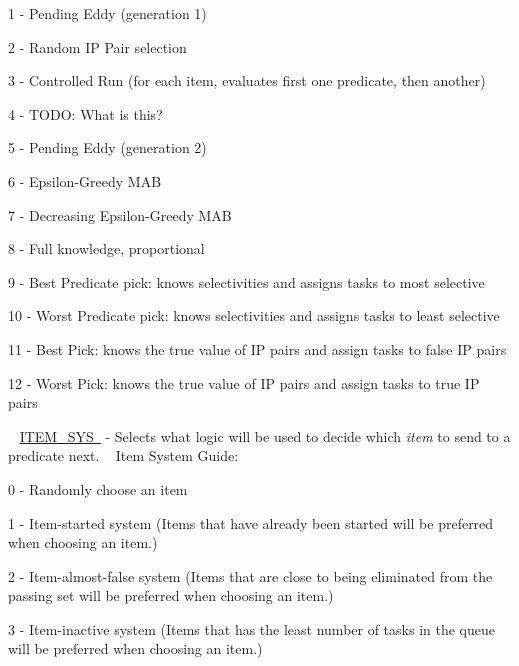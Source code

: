 \begin{DoxyItemize}
\item 1 -\/ Pending Eddy (generation 1)
\item 2 -\/ Random IP Pair selection
\item 3 -\/ Controlled Run (for each item, evaluates first one predicate, then another)
\item 4 -\/ T\+O\+DO\+: What is this?
\item 5 -\/ Pending Eddy (generation 2)
\item 6 -\/ Epsilon-\/\+Greedy M\+AB
\item 7 -\/ Decreasing Epsilon-\/\+Greedy M\+AB
\item 8 -\/ Full knowledge, proportional
\item 9 -\/ Best Predicate pick\+: knows selectivities and assigns tasks to most selective
\item 10 -\/ Worst Predicate pick\+: knows selectivities and assigns tasks to least selective
\item 11 -\/ Best Pick\+: knows the true value of IP pairs and assign tasks to false IP pairs
\item 12 -\/ Worst Pick\+: knows the true value of IP pairs and assign tasks to true IP pairs
\end{DoxyItemize}

~\newline
\mbox{\hyperlink{namespacedynamicfilterapp_1_1toggles_ae8b7db6fd373a0c3225ad361f894aee2}{I\+T\+E\+M\+\_\+\+S\+YS }} -\/ Selects what logic will be used to decide which {\itshape item} to send to a predicate next. ~\newline
Item System Guide\+:
\begin{DoxyItemize}
\item 0 -\/ Randomly choose an item
\item 1 -\/ Item-\/started system (Items that have already been started will be preferred when choosing an item.)
\item 2 -\/ Item-\/almost-\/false system (Items that are close to being eliminated from the passing set will be preferred when choosing an item.)
\item 3 -\/ Item-\/inactive system (Items that has the least number of tasks in the queue will be preferred when choosing an item.)
\end{DoxyItemize}

